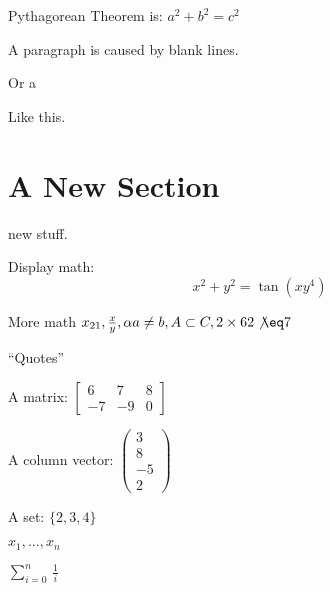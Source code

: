 \documentclass[12pt]{article}
\begin{document}
Pythagorean Theorem is: \(a^2 + b^2 = c^2\)

A paragraph is caused by blank lines.

Or a \par Like this.
\section{A New Section}

new stuff.

Display math: \[x^2+y^2=\tan(xy^4)\]


More math \(x_{21}, \frac{x}{y}, \alpha a \neq b, A \subset C, 2\times 6 2\not\eq 7\)

``Quotes''

A matrix:
\(\begin{bmatrix}
6 & 7 & 8\\
-7 & -9 & 0
\end{bmatrix}\)

A column vector:
\(\begin{pmatrix}
3\\
8\\
-5\\
2
\end{pmatrix}\)

A set: \(\{2,3,4\}\)

\(x_1, \ldots, x_n\)

\(\sum_{i=0}^{n}\,\frac{1}{i}\)
\end{document}
